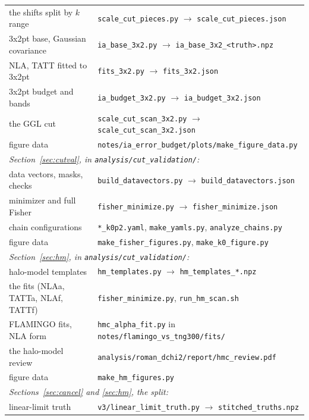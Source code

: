 \documentclass[11pt]{article}
\begin{document}
\begin{center}
\begin{tabular}{ll}
    the shifts split by $k$ range & \texttt{scale\_cut\_pieces.py} $\rightarrow$ \texttt{scale\_cut\_pieces.json} \\
    3x2pt base, Gaussian covariance & \texttt{ia\_base\_3x2.py} $\rightarrow$ \texttt{ia\_base\_3x2\_<truth>.npz} \\
    NLA, TATT fitted to 3x2pt & \texttt{fits\_3x2.py} $\rightarrow$ \texttt{fits\_3x2.json} \\
    3x2pt budget and bands & \texttt{ia\_budget\_3x2.py} $\rightarrow$ \texttt{ia\_budget\_3x2.json} \\
    the GGL cut & \texttt{scale\_cut\_scan\_3x2.py} $\rightarrow$ \texttt{scale\_cut\_scan\_3x2.json} \\
    figure data & \texttt{notes/ia\_error\_budget/plots/make\_figure\_data.py} \\
    \multicolumn{2}{l}{\textit{Section~\ref{sec:cutval}, in \texttt{analysis/cut\_validation/}:}} \\
    data vectors, masks, checks & \texttt{build\_datavectors.py} $\rightarrow$ \texttt{build\_datavectors.json} \\
    minimizer and full Fisher & \texttt{fisher\_minimize.py} $\rightarrow$ \texttt{fisher\_minimize.json} \\
    chain configurations & \texttt{*\_k0p2.yaml}, \texttt{make\_yamls.py}, \texttt{analyze\_chains.py} \\
    figure data & \texttt{make\_fisher\_figures.py}, \texttt{make\_k0\_figure.py} \\
    \multicolumn{2}{l}{\textit{Section~\ref{sec:hm}, in \texttt{analysis/cut\_validation/}:}} \\
    halo-model templates & \texttt{hm\_templates.py} $\rightarrow$ \texttt{hm\_templates\_*.npz} \\
    the fits (NLAa, TATTa, NLAf, TATTf) & \texttt{fisher\_minimize.py}, \texttt{run\_hm\_scan.sh} \\
    FLAMINGO fits, NLA form & \texttt{hmc\_alpha\_fit.py} in \texttt{notes/flamingo\_vs\_tng300/fits/} \\
    the halo-model review & \texttt{analysis/roman\_dchi2/report/hmc\_review.pdf} \\
    figure data & \texttt{make\_hm\_figures.py} \\
    \multicolumn{2}{l}{\textit{Sections~\ref{sec:cancel} and \ref{sec:hm}, the split:}} \\
    linear-limit truth & \texttt{v3/linear\_limit\_truth.py} $\rightarrow$ \texttt{stitched\_truths.npz} \\

\end{tabular}
\end{center}
\end{document}

